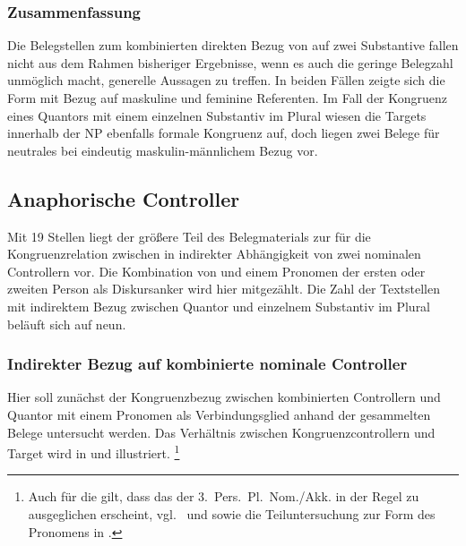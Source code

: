 \subsubsection{Zusammenfassung}

Die Belegstellen zum kombinierten direkten Bezug von \mbox{} auf
zwei Substantive fallen nicht aus dem Rahmen bisheriger
Ergebnisse, wenn es auch die geringe Belegzahl unmöglich macht, generelle
Aussagen zu treffen. In beiden Fällen zeigte sich die Form  mit
Bezug auf maskuline und feminine Referenten. Im Fall der Kongruenz eines
Quantors mit einem einzelnen Substantiv im Plural wiesen die Targets innerhalb
der NP ebenfalls formale Kongruenz auf,
doch liegen zwei Belege für neutrales  bei eindeutig
maskulin-männlichem Bezug vor.

\subsection{Anaphorische Controller}

Mit 19 Stellen liegt der größere Teil des Belegmaterials zur \KC{} für die
Kongruenzrelation zwischen  in indirekter Abhängigkeit von zwei
nominalen Controllern vor. Die Kombination von  und einem
Pronomen der ersten oder zweiten Person als Diskurs\-anker
wird hier mitgezählt. Die Zahl der Textstellen mit indirektem Bezug zwischen
Quantor und einzelnem Substantiv im Plural beläuft sich auf neun.

\subsubsection{Indirekter Bezug auf kombinierte nominale Controller}
\label{subsubssec:iconomctrlpers}

Hier soll zunächst der Kongruenzbezug zwischen kombinierten Controllern und
Quantor mit einem Pronomen als Verbindungsglied anhand der gesammelten Belege
untersucht werden. Das Verhältnis zwischen Kongruenzcontrollern und Target wird
in  und  illustriert.%
%
	\footnote{Auch für die \KC{} gilt, dass das  der
		3.~Pers.\ Pl.\ Nom./Akk. in der Regel zu  ausgeglichen
		erscheint,
		vgl.~\citet[213--214]{paul2007} und \citet[369, 390--397]{ksw2} sowie
		die Teiluntersuchung zur Form des Pronomens in
		.}

